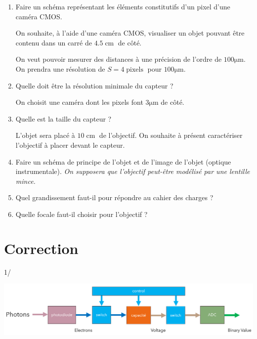 \documentclass[10pt]{article} %
\begin{document}
\begin{enumerate}
	\item Faire un schéma représentant les éléments constitutifs d'un pixel d'une caméra CMOS.
	
	\bigskip
	
	On souhaite, à l'aide d'une caméra CMOS, visualiser un objet pouvant être contenu dans un carré de $4.5\operatorname{cm}$ de côté.
	
	On veut pouvoir mesurer des distances à une précision de l'ordre de $100\operatorname{\mu{}m}$. On prendra une résolution de $S = 4\operatorname{pixels}$ pour $100\operatorname{\mu{}m}$.
	
	\item Quelle doit être la résolution minimale du capteur ?
	
	\bigskip	
	
	On choisit une caméra dont les pixels font $3\operatorname{\mu{}m}$ de côté.
	
	\medskip	
	
	\item Quelle est la taille du capteur ?

	\bigskip	
	
	L'objet sera placé à $10\operatorname{cm}$ de l'objectif. On souhaite à présent caractériser l'objectif à placer devant le capteur.	
	
	\medskip	
	
	\item Faire un schéma de principe de l'objet et de l'image de l'objet (optique instrumentale). \textit{On supposera que l'objectif peut-être modélisé par une lentille mince.}	

	\medskip	
	
	\item Quel grandissement faut-il pour répondre au cahier des charges ?
	\item Quelle focale faut-il choisir pour l'objectif ?
	
\end{enumerate}


\section*{Correction}

1/ 

\begin{center}
	\includegraphics[width=\textwidth]{images/pixel_to_adc.png}
\end{center}
\end{document}
